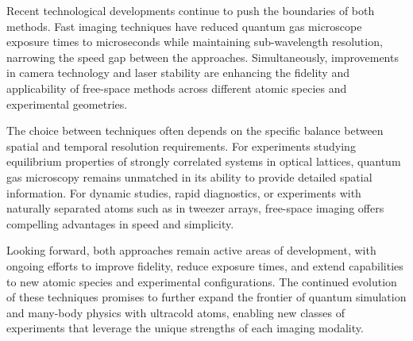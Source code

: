 Recent technological developments continue to push the boundaries of both methods. Fast imaging techniques \cite{su_fast_2025} have reduced quantum gas microscope exposure times to microseconds while maintaining sub-wavelength resolution, narrowing the speed gap between the approaches. Simultaneously, improvements in camera technology and laser stability are enhancing the fidelity and applicability of free-space methods across different atomic species and experimental geometries.

The choice between techniques often depends on the specific balance between spatial and temporal resolution requirements. For experiments studying equilibrium properties of strongly correlated systems in optical lattices, quantum gas microscopy remains unmatched in its ability to provide detailed spatial information. For dynamic studies, rapid diagnostics, or experiments with naturally separated atoms such as in tweezer arrays, free-space imaging offers compelling advantages in speed and simplicity.

Looking forward, both approaches remain active areas of development, with ongoing efforts to improve fidelity, reduce exposure times, and extend capabilities to new atomic species and experimental configurations. The continued evolution of these techniques promises to further expand the frontier of quantum simulation and many-body physics with ultracold atoms, enabling new classes of experiments that leverage the unique strengths of each imaging modality.

